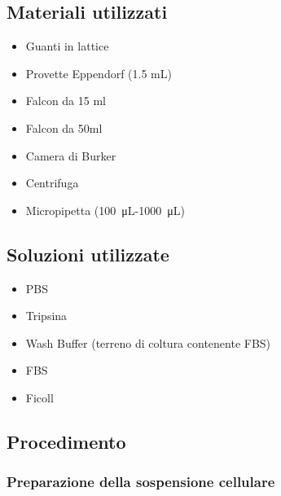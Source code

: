 \subsection{Materiali utilizzati}

\begin{itemize}
\item Guanti in lattice
\item Provette Eppendorf (1.5 mL)
\item Falcon da 15 ml
\item Falcon da 50ml
\item Camera di Burker
\item Centrifuga
\item Micropipetta (\SI{100}{\micro\liter}-\SI{1000}{\micro\liter})

\end{itemize}

\subsection{Soluzioni utilizzate}

\begin{itemize}

\item PBS
\item Tripsina
\item Wash Buffer (terreno di coltura contenente FBS)
\item FBS
\item Ficoll

\end{itemize}

\subsection{Procedimento}

\subsubsection{Preparazione della sospensione cellulare}

